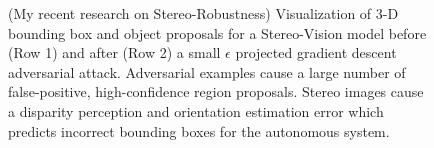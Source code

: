 \documentclass[12pt]{article}
\begin{document}



\begin{figure}
	  \caption{\label{1} \footnotesize{(My recent research on Stereo-Robustness) Visualization of 3-D bounding box and object proposals for a Stereo-Vision model before (Row 1) and after (Row 2) a small $\epsilon$ projected gradient descent adversarial attack. Adversarial examples cause a large number of false-positive, high-confidence region proposals. Stereo images cause a disparity perception and orientation estimation error which predicts incorrect bounding boxes for the autonomous system.}}
	\end{figure}
\end{document}
